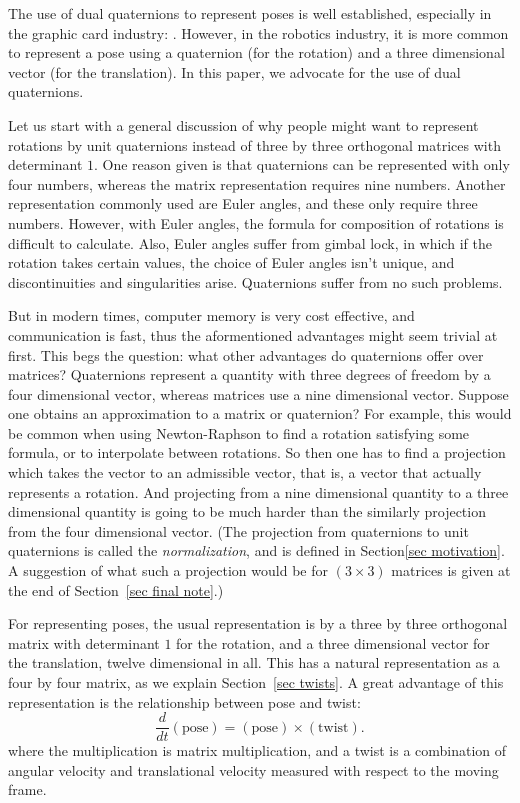 \documentclass[reqno,12pt]{amsart}
\begin{document}
The use of dual quaternions to represent poses is well established, especially in the graphic card industry: \cite{adorno,han-et-al,clifford,kavan-et-al,kavan-et-al-2,kenwright,schilling1,schilling2,wang-et-al}.  However, in the robotics industry, it is more common to represent a pose using a quaternion (for the rotation) and a three dimensional vector (for the translation).  In this paper, we advocate for the use of dual quaternions.

Let us start with a general discussion of why people might want to represent rotations by unit quaternions instead of three by three orthogonal matrices with determinant $1$.  One reason given is that quaternions can be represented with only four numbers, whereas the matrix representation requires nine numbers.  Another representation commonly used are Euler angles, and these only require three numbers.  However, with Euler angles, the formula for composition of rotations is difficult to calculate.  Also, Euler angles suffer from gimbal lock, in which if the rotation takes certain values, the choice of Euler angles isn't unique, and discontinuities and singularities arise.  Quaternions suffer from no such problems.

But in modern times, computer memory is very cost effective, and communication is fast, thus the aformentioned advantages might seem trivial at first.  This begs the question: what other advantages do quaternions offer over matrices?  Quaternions represent a quantity with three degrees of freedom by a four dimensional vector, whereas matrices use a nine dimensional vector.  Suppose one obtains an approximation to a matrix or quaternion?  For example, this would be common when using Newton-Raphson to find a rotation satisfying some formula, or to interpolate between rotations.  So then one has to find a projection which takes the vector to an admissible vector, that is, a vector that actually represents a rotation.  And projecting from a nine dimensional quantity to a three dimensional quantity is going to be much harder than the similarly projection from the four dimensional vector.  (The projection from quaternions to unit quaternions is called the \emph{normalization}, and is defined in Section\ref{sec motivation}.  A suggestion of what such a projection would be for $(3 \times 3)$ matrices is given at the end of Section~\ref{sec final note}.)

For representing poses, the usual representation is by a three by three orthogonal matrix with determinant $1$ for the rotation, and a three dimensional vector for the translation, twelve dimensional in all.  This has a natural representation as a four by four matrix, as we explain Section~\ref{sec twists}.  A great advantage of this representation is the relationship between pose and twist:
\begin{equation}
\label{pose twist}
\frac d{dt} (\text{pose}) = (\text{pose}) \times (\text{twist}).
\end{equation}
where the multiplication is matrix multiplication, and a twist is a combination of angular velocity and translational velocity measured with respect to the moving frame.
\end{document}
